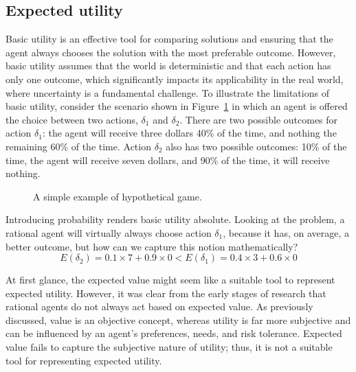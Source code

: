 \subsection{Expected utility}
Basic utility is an effective tool for comparing solutions and ensuring that the agent always chooses the solution with the most preferable outcome. However, basic utility assumes that the world is deterministic and that each action has only one outcome, which significantly impacts its applicability in the real world, where uncertainty is a fundamental challenge.
To illustrate the limitations of basic utility, consider the scenario shown in Figure~\ref{fig:expected_utility} in which an agent is offered the choice between two actions, $\delta_1$ and $\delta_2$. There are two possible outcomes for action $\delta_1$: the agent will receive three dollars 40\% of the time, and nothing the remaining 60\% of the time. Action $\delta_2$ also has two possible outcomes: 10\% of the time, the agent will receive seven dollars, and 90\% of the time, it will receive nothing.

\begin{figure}[H]
    \centering
        \caption{A simple example of hypothetical game.}
        \label{fig:expected_utility}
\end{figure}

Introducing probability renders basic utility absolute. Looking at the problem, a rational agent will virtually always choose action $\delta_1$, because it has, on average, a better outcome, but how can we capture this notion mathematically?
$$ E(\delta_2) = 0.1 \times 7 + 0.9 \times 0  < E(\delta_1) = 0.4 \times 3 + 0.6 \times 0 $$

At first glance, the expected value might seem like a suitable tool to represent expected utility. However, it was clear from the early stages of research that rational agents do not always act based on expected value. As previously discussed, value is an objective concept, whereas utility is far more subjective and can be influenced by an agent's preferences, needs, and risk tolerance. Expected value fails to capture the subjective nature of utility; thus, it is not a suitable tool for representing expected utility.

